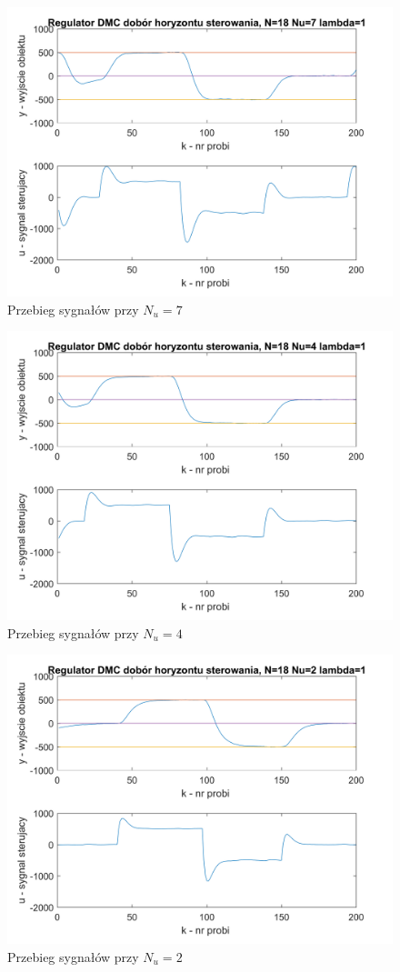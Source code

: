 \documentclass[a4paper, 10pt]{article}
\begin{document}
\begin{figure}[H]
	\centering
	\includegraphics[width=0.9\linewidth]{DMC1871}
	\caption{Przebieg sygnałów przy $N_{u}=7$}
	\label{fig:DMC1871}
\end{figure}
\begin{figure}[H]
	\centering
	\includegraphics[width=0.9\linewidth]{DMC1841}
	\caption{Przebieg sygnałów przy $N_{u}=4$}
	\label{fig:DMC1841}
\end{figure}
\begin{figure}[H]
	\centering
	\includegraphics[width=0.9\linewidth]{DMC1821}
	\caption{Przebieg sygnałów przy $N_{u}=2$}
	\label{fig:DMC1821}
\end{figure}
\end{document}

